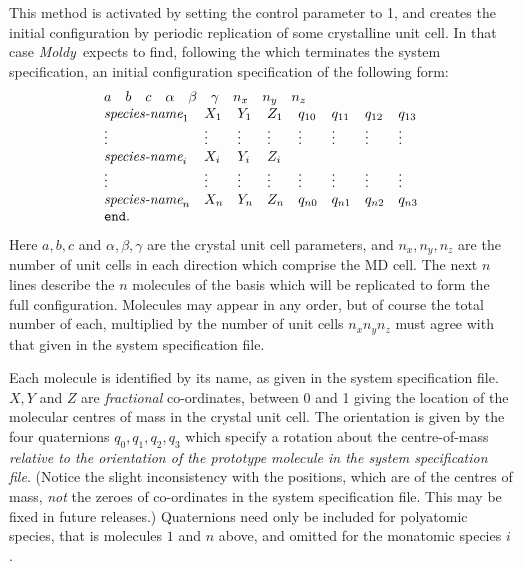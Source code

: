 \documentclass[a4paper,twoside]{report}
\newcommand{\moldy}{\emph{Moldy}}
\begin{document}
This method is activated by setting the control parameter
 to 1, and creates the initial configuration by
periodic replication of some crystalline unit cell.  In that case
\moldy\  expects to find, following the  which terminates the
system specification, an initial configuration specification of the
following form:
\begin{displaymath}
\begin{array}{llllllll}
\multicolumn{8}{l}{a \quad b \quad c \quad \alpha \quad \beta \quad
  \gamma \quad n_{x} \quad n_{y} \quad n_{z}} \\ 
\textit{species-name}_{1} &
X_{1} & Y_{1} & Z_{1} &  q_{10} & q_{11} & q_{12} & q_{13} \\
\vdots &  \vdots & \vdots & \vdots & \vdots & \vdots & \vdots & \vdots \\
\textit{species-name}_{i} & X_{i} & Y_{i} & Z_{i} \\
\vdots &  \vdots & \vdots & \vdots & \vdots & \vdots & \vdots & \vdots \\
\textit{species-name}_{n} &
X_{n} & Y_{n} & Z_{n} &  q_{n0} & q_{n1} & q_{n2} & q_{n3}  \\
\Lit{end}. \\
\end{array}
\end{displaymath}
Here $a, b, c$ and $\alpha, \beta, \gamma$ are the crystal unit cell
parameters, and $n_{x}, n_{y}, n_{z}$ are the number of unit cells in
each direction which comprise the MD cell.  The next $n$ lines
describe the $n$ molecules of the basis which will be replicated to
form the full configuration.  Molecules may appear in any order, but
of course the total number of each, multiplied by the number of unit
cells $n_{x} n_{y} n_{z}$ must agree with that given in the system
specification file.

Each molecule is identified by its name, as given in the system
specification file.  $X, Y$ and $Z$ are \emph{fractional}
co-ordinates, between 0 and 1 giving the location of the molecular
centres of mass in the crystal unit cell. The orientation is given by
the four quaternions $q_{0}, q_{1}, q_{2}, q_{3}$ which specify a
rotation about the centre-of-mass \emph{relative to the orientation of
  the prototype molecule in the system specification file}.  (Notice
the slight inconsistency with the positions, which are of the centres
of mass, \emph{not} the zeroes of co-ordinates in the system
specification file. This may be fixed in future releases.)
Quaternions need only be included for polyatomic species, that is
molecules $1$ and $n$ above, and omitted for the monatomic species
$i$.
\end{document}
